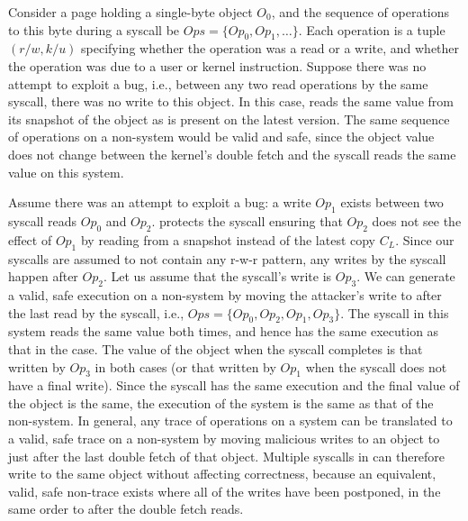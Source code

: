 \documentclass[letterpaper,twocolumn,10pt]{article}
\begin{document}
Consider a page holding a single-byte object $O_0$, and the
sequence of operations to this byte during a \midas syscall be
$Ops = \{Op_0, Op_1, \dots \}$.
Each operation is a tuple $(r/w, k/u)$ specifying whether the
operation was a read or a write, and whether the operation was due to
a user or kernel instruction.
Suppose there was no attempt to exploit a \tocttou bug, i.e., between
any two read operations by the same syscall, there was no write to
this object.
In this case, \midas reads the same value from its snapshot of the
object as is present on the latest version.
The same sequence of operations on a non-\midas system would be valid and
safe, since the object value does not change between the kernel's double
fetch and the syscall reads the same value on this system.

%
Assume there was an attempt to exploit a \tocttou bug:
a write $Op_1$ exists between two syscall reads $Op_0$ and $Op_2$.
\midas protects the syscall ensuring that $Op_2$ does not see the
effect of $Op_1$ by reading from a snapshot instead of the latest
copy $C_L$.
Since our syscalls are assumed to not contain any r-w-r pattern,
any writes by the syscall happen after $Op_2$.
Let us assume that the syscall's write is $Op_3$.
We can generate a valid, safe execution on a non-\midas system
by moving the attacker's write to after the last read by the
syscall, i.e., $Ops = \{Op_0, Op_2, Op_1, Op_3\}$.
The syscall in this system reads the same value both times, and
hence has the same execution as that in the \midas case.
The value of the object when the syscall completes is that
written by $Op_3$ in both cases (or that written by $Op_1$ when
the syscall does not have a final write).
Since the syscall has the same execution and the final value of
the object is the same, the execution of the \midas system
is the same as that of the non-\midas system.
In general, any trace of operations on a \midas system can
be translated  to a valid, safe trace on a non-\midas system
by moving malicious writes to an object to just after the last
double fetch of that object.
Multiple syscalls in \midas can therefore write to the same object
without affecting
correctness, because an equivalent, valid, safe non-\midas trace
exists where all of the writes have been postponed, in the same order
to after the double fetch reads.
\end{document}
